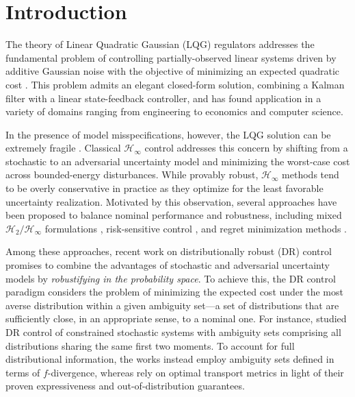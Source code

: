 \documentclass[letterpaper, 10 pt, conference]{ieeeconf}  %
\theoremstyle{ieeeconf}
\begin{document}
\section{Introduction}
The theory of Linear Quadratic Gaussian (LQG) regulators addresses the fundamental problem of controlling partially-observed linear systems driven by additive Gaussian noise with the objective of minimizing an expected quadratic cost \cite{bertsekas2012dynamic}. This problem admits an elegant closed-form solution, combining a Kalman filter with a linear state-feedback controller, and has found application in a variety of domains ranging from engineering to economics and computer science.

In the presence of model misspecifications, however, the LQG solution can be extremely fragile \cite{doyle1978guaranteed}. Classical $\mathcal{H}_\infty$ control \cite{zhou1998essentials} addresses this concern by shifting from a stochastic to an adversarial uncertainty model and minimizing the worst-case cost across bounded-energy disturbances. While provably robust, $\mathcal{H}_\infty$ methods tend to be overly conservative in practice as they optimize for the least favorable uncertainty realization. Motivated by this observation, several approaches have been proposed to balance nominal performance and robustness, including mixed $\mathcal{H}_2/\mathcal{H}_\infty$ formulations \cite{bernstein1988lqg, doyle1989optimal}, risk-sensitive control \cite{jacobson1973optimal}, and regret minimization methods \cite{martin2025guarantees, goel2023regret, martin2024regret}.

Among these approaches, recent work on distributionally robust (DR) control promises to combine the advantages of stochastic and adversarial uncertainty models by \emph{robustifying in the probability space}. To achieve this, the DR control paradigm considers the problem of minimizing the expected cost under the most averse distribution within a given ambiguity set—a set of distributions that are sufficiently close, in an appropriate sense, to a nominal one. For instance, \cite{van2015distributionally} studied DR control of constrained stochastic systems with ambiguity sets comprising all distributions sharing the same first two moments. To account for full distributional information, the works \cite{petersen2000minimax, falconi2025distributionally, fochesato2025distributionally} instead employ ambiguity sets defined in terms of $f$-divergence, whereas \cite{taskesen2023distributionally, lanzetti2024optimality, yang2020wasserstein, brouillon2025distributionally, aolaritei2023wasserstein, kargin2024infinite} rely on optimal transport metrics in light of their proven expressiveness and out-of-distribution guarantees.
\end{document}
